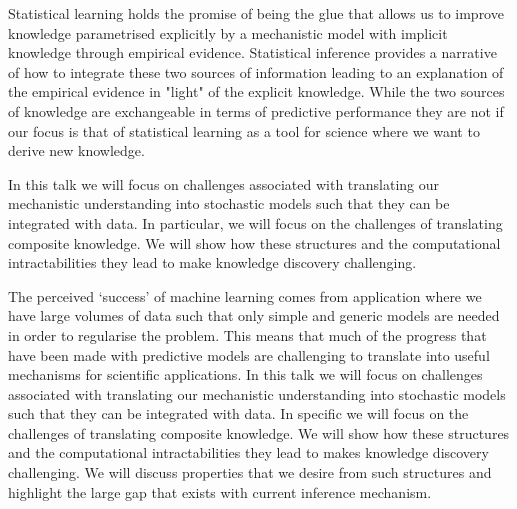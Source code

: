 \license

Statistical learning holds the promise of being the glue that allows us to improve knowledge parametrised explicitly by a mechanistic model with implicit knowledge through empirical evidence. Statistical inference provides a narrative of how to integrate these two sources of information leading to an explanation of the empirical evidence in "light" of the explicit knowledge. While the two sources of knowledge are exchangeable in terms of predictive performance they are not if our focus is that of statistical learning as a tool for science where we want to derive new knowledge.

In this talk we will focus on challenges associated with translating our mechanistic understanding into stochastic models such that they can be integrated with data. In particular, we will focus on the challenges of translating composite knowledge. We will show how these structures and the computational intractabilities they lead to make knowledge discovery challenging. 

The perceived `success' of machine learning comes from application where we have large volumes of data such that only simple and generic models are needed in order to regularise the problem. This means that much of the progress that have been made with predictive models are challenging to translate into useful mechanisms for scientific applications. In this talk we will focus on challenges associated with translating our mechanistic understanding into stochastic models such that they can be integrated with data. In specific we will focus on the challenges of translating composite knowledge. We will show how these structures and the computational intractabilities they lead to makes knowledge discovery challenging. We will discuss properties that we desire from such structures and highlight the large gap that exists with current inference mechanism.
